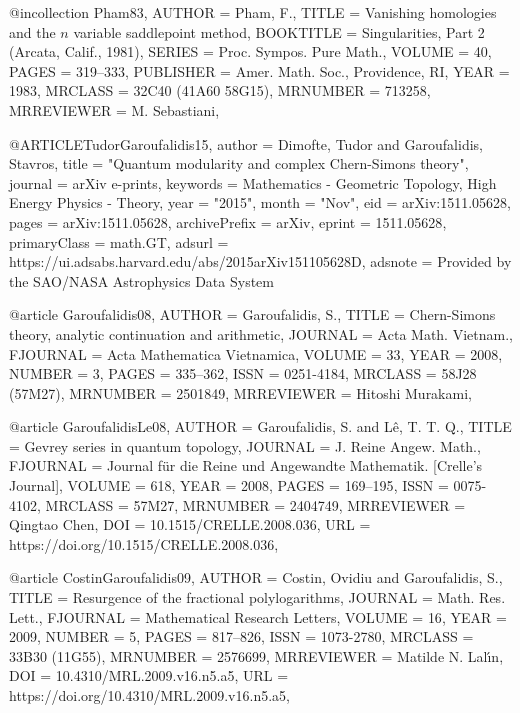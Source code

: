 @incollection {Pham83,
    AUTHOR = {Pham, F.},
     TITLE = {Vanishing homologies and the {$n$} variable saddlepoint
              method},
 BOOKTITLE = {Singularities, {P}art 2 ({A}rcata, {C}alif., 1981)},
    SERIES = {Proc. Sympos. Pure Math.},
    VOLUME = {40},
     PAGES = {319--333},
 PUBLISHER = {Amer. Math. Soc., Providence, RI},
      YEAR = {1983},
   MRCLASS = {32C40 (41A60 58G15)},
  MRNUMBER = {713258},
MRREVIEWER = {M. Sebastiani},
}

@ARTICLE{TudorGaroufalidis15,
       author = {{Dimofte}, Tudor and {Garoufalidis}, Stavros},
        title = "{Quantum modularity and complex Chern-Simons theory}",
      journal = {arXiv e-prints},
     keywords = {Mathematics - Geometric Topology, High Energy Physics - Theory},
         year = "2015",
        month = "Nov",
          eid = {arXiv:1511.05628},
        pages = {arXiv:1511.05628},
archivePrefix = {arXiv},
       eprint = {1511.05628},
 primaryClass = {math.GT},
       adsurl = {https://ui.adsabs.harvard.edu/abs/2015arXiv151105628D},
      adsnote = {Provided by the SAO/NASA Astrophysics Data System}
}

@article {Garoufalidis08,
    AUTHOR = {Garoufalidis, S.},
     TITLE = {Chern-{S}imons theory, analytic continuation and arithmetic},
   JOURNAL = {Acta Math. Vietnam.},
  FJOURNAL = {Acta Mathematica Vietnamica},
    VOLUME = {33},
      YEAR = {2008},
    NUMBER = {3},
     PAGES = {335--362},
      ISSN = {0251-4184},
   MRCLASS = {58J28 (57M27)},
  MRNUMBER = {2501849},
MRREVIEWER = {Hitoshi Murakami},
}

@article {GaroufalidisLe08,
    AUTHOR = {Garoufalidis, S. and L\^e, T. T. Q.},
     TITLE = {Gevrey series in quantum topology},
   JOURNAL = {J. Reine Angew. Math.},
  FJOURNAL = {Journal f\"ur die Reine und Angewandte Mathematik. [Crelle's
              Journal]},
    VOLUME = {618},
      YEAR = {2008},
     PAGES = {169--195},
      ISSN = {0075-4102},
   MRCLASS = {57M27},
  MRNUMBER = {2404749},
MRREVIEWER = {Qingtao Chen},
       DOI = {10.1515/CRELLE.2008.036},
       URL = {https://doi.org/10.1515/CRELLE.2008.036},
}

@article {CostinGaroufalidis09,
    AUTHOR = {Costin, Ovidiu and Garoufalidis, S.},
     TITLE = {Resurgence of the fractional polylogarithms},
   JOURNAL = {Math. Res. Lett.},
  FJOURNAL = {Mathematical Research Letters},
    VOLUME = {16},
      YEAR = {2009},
    NUMBER = {5},
     PAGES = {817--826},
      ISSN = {1073-2780},
   MRCLASS = {33B30 (11G55)},
  MRNUMBER = {2576699},
MRREVIEWER = {Matilde N. Lal\'\i n},
       DOI = {10.4310/MRL.2009.v16.n5.a5},
       URL = {https://doi.org/10.4310/MRL.2009.v16.n5.a5},
}

